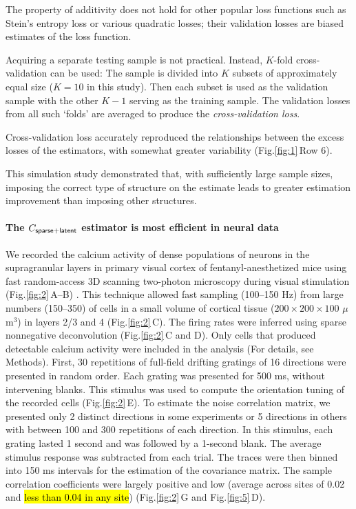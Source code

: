\documentclass[10pt]{article}
\newcommand{\sq}[1]{\lq#1\rq}
\newcommand{\figref}[2]{Fig.\;\ref{fig:#1}\,#2}
\begin{document}
The property of additivity does not hold for other popular loss functions such as Stein's entropy loss or various quadratic losses; their validation losses are biased estimates of the loss function. 

Acquiring a separate testing sample is not practical. Instead, $K$-fold cross-validation can be used: The sample is divided into $K$ subsets of approximately equal size ($K=10$ in this study).  Then each subset is used as the validation sample with the other $K-1$ serving as the training sample. The validation losses from all such \sq{folds} are averaged to produce the \emph{cross-validation loss}.  

Cross-validation loss accurately reproduced the relationships between the excess losses of the estimators, with somewhat greater variability (\figref{1}{Row 6}). 

This simulation study demonstrated that, with sufficiently large sample sizes, imposing the correct type of structure on the estimate leads to greater estimation improvement than imposing other structures.

\paragraph{The $C_{\sf sparse+latent}$ estimator is most efficient in neural data}
We recorded the calcium activity of dense populations of neurons in the supragranular layers in primary visual cortex of fentanyl-anesthetized mice using fast random-access 3D scanning two-photon microscopy during visual stimulation (\figref{2}{A--B}) \cite{Reddy:2005, Katona:2012, Cotton:2013}. This technique allowed fast sampling (100--150 Hz) from large numbers (150--350) of cells in a small volume of cortical tissue ($200\times200\times100$ $\mu$m$^3$) in layers 2/3 and 4 (\figref{2}{C}).  The firing rates were inferred using sparse nonnegative deconvolution \cite{Vogelstein:2010} (\figref{2}{C and D}). Only cells that produced detectable calcium activity were included in the analysis (For details, see Methods).  First, 30 repetitions of full-field drifting gratings of 16 directions were presented in random order.  Each grating was presented for 500 ms, without intervening blanks.  This stimulus was used to compute the orientation tuning of the recorded cells (\figref{2}{E}). To estimate the noise correlation matrix, we presented only 2 distinct directions in some experiments or 5 directions in others with between 100 and 300 repetitions of each direction. In this stimulus, each grating lasted 1 second and was followed by a 1-second blank.  The average stimulus response was subtracted from each trial. The traces were then binned into 150 ms intervals for the estimation of the covariance matrix.   The sample correlation coefficients were largely positive and low (average across sites of 0.02 and \hl{less than 0.04 in any site}) (\figref{2}{G} and \figref{5}{D}).  
\end{document}
